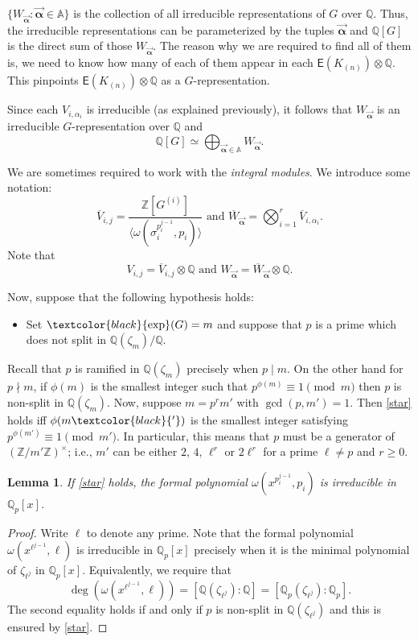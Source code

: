 \documentclass{amsart}
\makeatletter
\newcommand{\edit}[1]{\textcolor{black}{#1}}
\newtheorem{lemma}[theorem]{Lemma}
\numberwithin{equation}{section}
\theoremstyle{remark}
\newcommand{\val}{\vec{\boldsymbol{\alpha}}}
\newcommand{\EC}{\mathsf{E}}
\newcommand{\Qp}{\mathbb{Q}_p}
\newcommand{\Z}{\mathbb{Z}}
\newcommand{\A}{\mathbb{A}}
\newcommand{\Q}{\mathbb{Q}}
\renewcommand{\exp}{\operatorname{exp}}
\theoremstyle{plain} %
\newcommand{\mylabel}[2]{#2\def\@currentlabel{#2}\label{#1}}
\makeatother
\begin{document}
$\{W_{\val} \colon \val \in \A\}$ is the collection of  all irreducible representations of $G$ over $\Q$.
Thus, the irreducible representations can be parameterized by the tuples $\val$ and $\Q[G]$ is the direct sum of those $W_{\val}$.
The reason why we are required to find all of them is, we need to know how many of each of them appear in each $\EC(K_{(n)}) \otimes \Q$.
This pinpoints $\EC(K_{(n)}) \otimes \Q$ as a $G$-representation.

Since each $V_{i,\alpha_i}$ is irreducible (as explained previously), it follows that $W_{\val}$ is an irreducible $G$-representation over $\Q$ and
\[
\Q[G] \simeq \bigoplus_{\val\in \A} W_{\val}.
\]

We are sometimes required to work with the \emph{integral modules}.
We introduce some notation:
\[
\overline{V}_{i,j} = \frac{\Z[G^{(i)}]}{\langle \omega(\sigma_i^{p_i^{j - 1}}, p_i) \rangle} \text{ and } \overline{W}_{\val} = \bigotimes_{i=1}^r \overline{V}_{i, \alpha_i}.
\]
Note that
\[
V_{i,j} = \overline{V}_{i,j} \otimes \Q \text{ and } W_{\val} = \overline{W}_{\val}\otimes \Q.
\]



Now, suppose that the following hypothesis holds:
\vspace{0.2cm}
\begin{itemize}
\item[\mylabel{star}{\textup{(}$\star$\textup{)}}] Set $\edit{\exp}(G) = m$ and suppose that $p$ is a prime which does not split in $\Q(\zeta_m)/\Q$.
\end{itemize}
\vspace{0.2cm}
Recall that $p$ is ramified in $\Q(\zeta_m)$ precisely when $p\mid m$.
On the other hand for $p\nmid m$, if $\phi(m)$ is the smallest integer such that $p^{\phi(m)} \equiv 1 \pmod{m}$ then $p$ is non-split in $\Q(\zeta_m)$.
Now, suppose $m = p^r m'$ with $\gcd(p,m') =1$.
Then \ref{star} holds iff $\phi(m\edit{'})$ is the smallest integer satisfying $p^{\phi(m')} \equiv 1 \pmod{m'}$.
In particular, this means that $p$ must be a generator of $(\Z/m'\Z)^{\times}$; i.e., $m'$ can be either $2$, $4$, $\ell^r$ or $2\ell^r$ for a prime $\ell \neq p$ and $r\geq 0$.

\begin{lemma}
If \ref{star} holds, the formal polynomial $\omega(x^{p_i^{j-1}}, p_i)$ is irreducible in $\Qp[x]$.
\end{lemma}

\begin{proof}
Write $\ell$ to denote any prime.
Note that the formal polynomial $\omega(x^{\ell^{j-1}}, \ell)$ is irreducible in $\Qp[x]$ precisely when it is the minimal polynomial of $\zeta_{\ell^{j}}$ in $\Qp[x]$.
Equivalently, we require that 
\[
\deg(\omega(x^{\ell^{j-1}}, \ell)) = [\Q(\zeta_{\ell^j}): \Q] =[\Qp(\zeta_{\ell^j}): \Qp].
\]
The second equality holds if and only if $p$ is non-split in $\Q(\zeta_{\ell^j})$ and this is ensured by \ref{star}.
\end{proof}
\end{document}
